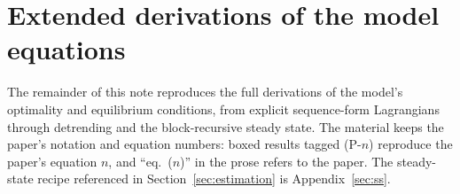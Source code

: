 \documentclass[11pt]{article}
\theoremstyle{definition}
\begin{document}
\newpage

\appendix
\section{Extended derivations of the model equations}\label{app:derivations}
The remainder of this note reproduces the full derivations of the model's optimality and equilibrium
conditions, from explicit sequence-form Lagrangians through detrending and the block-recursive steady
state. The material keeps the paper's notation and equation numbers: boxed results tagged (P-$n$)
reproduce the paper's equation $n$, and ``eq.\ ($n$)'' in the prose refers to the paper. The
steady-state recipe referenced in Section~\ref{sec:estimation} is
Appendix~\ref{sec:ss}.


\end{document}

